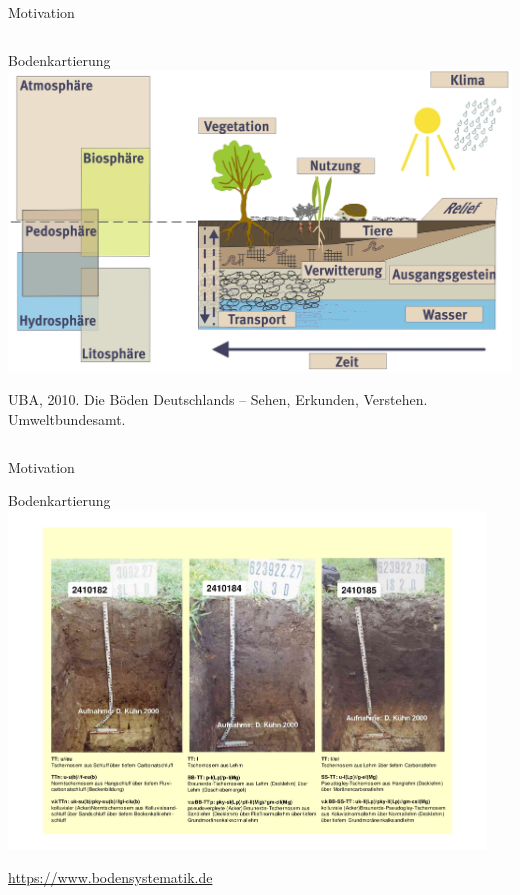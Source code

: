 \begin{frame}{Motivation}
\begin{columns}
 \column{9cm} 
 \begin{block}{Bodenkartierung}
\centering\includegraphics[width=1\textwidth]{FIGURE/03_bodenentstehung_website_2013_0.jpg}
\raggedright\tiny 
UBA, 2010. Die Böden Deutschlands -- Sehen, Erkunden, Verstehen. Umweltbundesamt.
\end{block}
\end{columns}
\end{frame}



\begin{frame}{Motivation}
 \begin{block}{Bodenkartierung}
\centering\includegraphics[width=0.95\textwidth]{FIGURE/Schwarzerden_LBGR.pdf}
 \end{block}
\raggedright\tiny\url{https://www.bodensystematik.de}
\end{frame}


